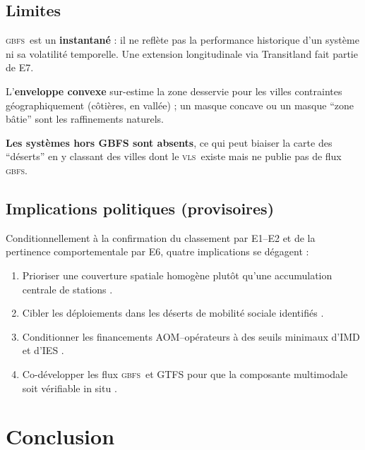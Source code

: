 \documentclass[11pt,a4paper]{article}
\newcommand{\VLS}{\textsc{vls}\xspace}
\newcommand{\GBFS}{\textsc{gbfs}\xspace}
\begin{document}
\subsection{Limites}

\begin{limite}
\GBFS\ est un \textbf{instantané} : il ne reflète pas la
performance historique d'un système ni sa volatilité temporelle.
Une extension longitudinale via Transitland fait partie de E7.
\end{limite}

\begin{limite}
L'\textbf{enveloppe convexe} sur-estime la zone desservie pour
les villes contraintes géographiquement (côtières, en vallée) ;
un masque concave ou un masque \enquote{zone bâtie} sont les
raffinements naturels.
\end{limite}

\begin{limite}
\textbf{Les systèmes hors GBFS sont absents}, ce qui peut biaiser
la carte des \enquote{déserts} en y classant des villes dont le
\VLS\ existe mais ne publie pas de flux \GBFS.
\end{limite}

\subsection{Implications politiques (provisoires)}

Conditionnellement à la confirmation du classement par E1--E2 et
de la pertinence comportementale par E6, quatre implications se
dégagent :
\begin{enumerate}[leftmargin=*,itemsep=0.15em]
    \item Prioriser une couverture spatiale homogène plutôt qu'une
    accumulation centrale de stations \citep{ElGeneidy2016,
    Saberi2018}.
    \item Cibler les déploiements dans les déserts de mobilité
    sociale identifiés \citep{Hodge1995, Smith2015, Cerema2022}.
    \item Conditionner les financements AOM--opérateurs à des
    seuils minimaux d'IMD et d'IES \citep{OECD2008}.
    \item Co-développer les flux \GBFS\ et GTFS pour que la
    composante multimodale soit vérifiable in situ
    \citep{Saberi2018, Mobi2024}.
\end{enumerate}

\section{Conclusion}
\label{sec:conclusion}
\end{document}
